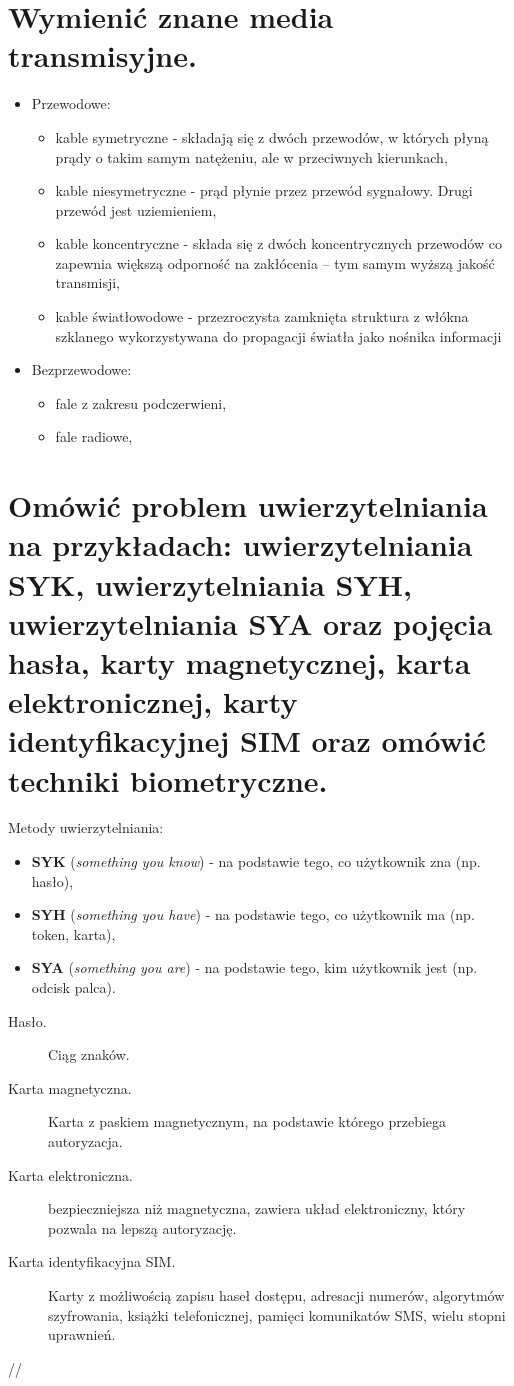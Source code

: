\documentclass[12pt,a4paper]{article}
\begin{document}
	\section{Wymienić znane media transmisyjne.}
	\begin{itemize}
		\item Przewodowe:
		\begin{itemize}
			\item kable symetryczne - składają się z dwóch przewodów, w których płyną prądy o takim samym natężeniu, ale w przeciwnych kierunkach,
			\item kable niesymetryczne - prąd płynie przez przewód sygnałowy. Drugi przewód jest uziemieniem,
			\item kable koncentryczne - składa się z dwóch koncentrycznych przewodów co zapewnia większą odporność na zakłócenia – tym samym wyższą jakość transmisji,
			\item kable światłowodowe - przezroczysta zamknięta struktura z włókna szklanego wykorzystywana do propagacji światła jako nośnika informacji
		\end{itemize}
		\item Bezprzewodowe:
		\begin{itemize}
			\item fale z zakresu podczerwieni,
			\item fale radiowe,
		\end{itemize}
	\end{itemize}

	\section{Omówić problem uwierzytelniania na przykładach: uwierzytelniania SYK, uwierzytelniania SYH, uwierzytelniania SYA oraz pojęcia hasła, karty magnetycznej, karta elektronicznej, karty identyfikacyjnej SIM oraz omówić techniki biometryczne.}
	Metody uwierzytelniania:
	\begin{itemize}
		\item \textbf{SYK} (\textit{something you know}) - na podstawie tego, co użytkownik zna (np. hasło),
		\item \textbf{SYH} (\textit{something you have}) - na podstawie tego, co użytkownik ma (np. token, karta),
		\item \textbf{SYA} (\textit{something you are}) - na podstawie tego, kim użytkownik jest (np. odcisk palca).
	\end{itemize}

	\begin{description}
		\item[Hasło.] Ciąg znaków.
		\item[Karta magnetyczna.] Karta z paskiem magnetycznym, na podstawie którego przebiega autoryzacja.
		\item[Karta elektroniczna.] bezpieczniejsza niż magnetyczna, zawiera układ elektroniczny, który pozwala na lepszą autoryzację.
		\item[Karta identyfikacyjna SIM.] Karty z możliwością zapisu haseł dostępu, adresacji numerów, algorytmów szyfrowania, książki telefonicznej, pamięci komunikatów SMS, wielu stopni uprawnień.
	\end{description}//
\end{document}
